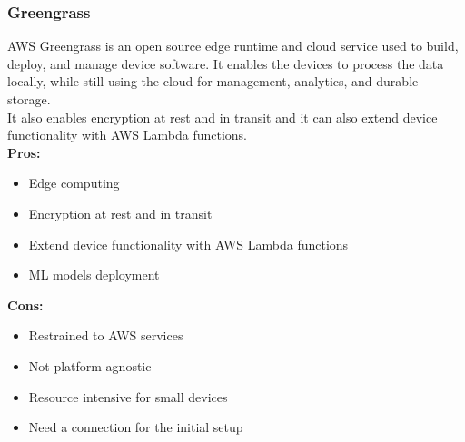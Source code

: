         \subsubsection{Greengrass}
        \label{aws:greengrass}
        AWS Greengrass is an open source edge runtime and cloud service used to build, deploy, and manage device software. 
        It enables the devices to process the data locally, while still using the cloud for management, analytics, and durable storage.\\
        It also enables encryption at rest and in transit and it can also extend device functionality with AWS Lambda functions.\\
        \textbf{Pros:}
        \begin{itemize}
            \item Edge computing
            \item Encryption at rest and in transit
            \item Extend device functionality with AWS Lambda functions
            \item ML models deployment
        \end{itemize}
        \textbf{Cons:}
        \begin{itemize}
            \item Restrained to AWS services
            \item Not platform agnostic
            \item Resource intensive for small devices
            \item Need a connection for the initial setup
        \end{itemize}
        
